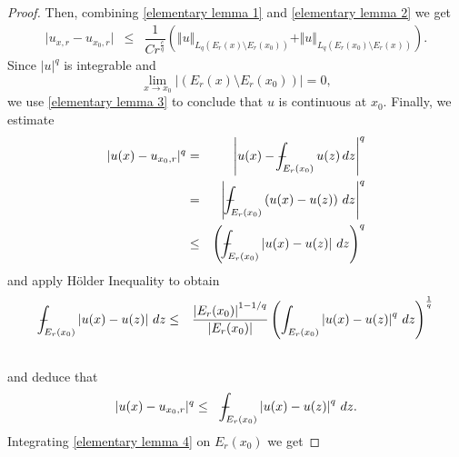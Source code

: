 \documentclass[10pt, leqno]{article}
\def\Xint#1{\mathchoice
{\XXint\displaystyle\textstyle{#1}}
{\XXint\textstyle\scriptstyle{#1}}
{\XXint\scriptstyle\scriptscriptstyle{#1}}
{\XXint\scriptscriptstyle\scriptscriptstyle{#1}}
\!\int}
\def\XXint#1#2#3{{\setbox0=\hbox{$#1{#2#3}{\int}$ }
\vcenter{\hbox{$#2#3$ }}\kern-.6\wd0}}
\def\dashint{\Xint-}
\theoremstyle{definition}
\theoremstyle{remark}
\numberwithin{equation}{section}
\begin{document}
\begin{proof}
Then, combining \eqref{elementary lemma 1} and \eqref{elementary lemma 2} we get
\begin{eqnarray}
\label{elementary lemma 3}
\vert u_{x, r} - u_{x_{0}, r} \vert & \leq & \dfrac{1}{Cr^{\frac{c}{q}}} \left( \Vert u \Vert_{L_{q}(E_{r}(x)\setminus E_{r}(x_{0}))} + \Vert u \Vert_{L_{q}(E_{r}(x_{0})\setminus E_{r}(x_{}))} \right).
\end{eqnarray}
Since $\vert u \vert^{q}$ is integrable and
$$
\lim_{x \rightarrow x_{0}} \vert (E_{r}(x)\setminus E_{r}(x_{0}))\vert = 0,
$$
we use \eqref{elementary lemma 3} to conclude that $u$ is continuous at $x_{0}$. Finally, we estimate
\begin{eqnarray}
\label{}
\vert u(x) - u_{x_{0}, r} \vert^{q} & = & \nonumber \left | u(x) - \displaystyle \dashint_{E_{r}(x_{0})}u(z)\, dz  \right |^{q} \\
& = & \left |  \displaystyle \dashint_{E_{r}(x_{0})} \left( u(x) - u(z) \right) \, dz  \right |^{q} \\ \nonumber
& \leq & \left(  \displaystyle \dashint_{E_{r}(x_{0})} \left| u(x) - u(z) \right | \, dz  \right)^{q}
\end{eqnarray}
and apply H\" older Inequality to obtain
\begin{eqnarray}
\label{}
\displaystyle \dashint_{E_{r}(x_{0})} \left| u(x) - u(z)   \right| \, dz & \leq & \dfrac{\left | E_{r}(x_{0}) \right |^{1 - 1/q }}{\left | E_{r}(x_{0}) \right |} \left(\int_{E_{r}(x_{0})} \left| u(x) - u(z) \right |^{q} \, dz \right )^{\frac{1}{q}} \\ \nonumber
\end{eqnarray}
and deduce that
\begin{eqnarray}
\label{elementary lemma 4}
\vert u(x) - u_{x_{0}, r} \vert^{q} & \leq & \displaystyle \dashint_{E_{r}(x_{0})} \left| u(x) - u(z) \right |^{q} \, dz.
\end{eqnarray}
Integrating \eqref{elementary lemma 4} on $E_{r}(x_{0})$ we get


\end{proof}
\end{document}

